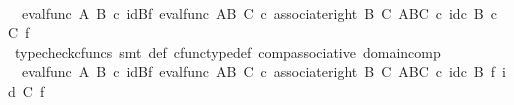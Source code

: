 \begin{isabellebody}
\ \isamarkupfalse%
\ {\isachardoublequoteopen}{\isachardot}{\kern0pt}{\isachardot}{\kern0pt}{\isachardot}{\kern0pt}\ {\isacharequal}{\kern0pt}{\isacharparenleft}{\kern0pt}eval{\isacharunderscore}{\kern0pt}func\ A\ B{\isacharparenright}{\kern0pt}\ {\isasymcirc}\isactrlsub c\ {\isacharparenleft}{\kern0pt}id{\isacharparenleft}{\kern0pt}B{\isacharparenright}{\kern0pt}{\isasymtimes}\isactrlsub f\ eval{\isacharunderscore}{\kern0pt}func\ {\isacharparenleft}{\kern0pt}A\isactrlbsup B\isactrlesup {\isacharparenright}{\kern0pt}\ C{\isacharparenright}{\kern0pt}\ {\isasymcirc}\isactrlsub c\ {\isacharparenleft}{\kern0pt}associate{\isacharunderscore}{\kern0pt}right\ B\ C\ {\isacharparenleft}{\kern0pt}{\isacharparenleft}{\kern0pt}A\isactrlbsup B\isactrlesup {\isacharparenright}{\kern0pt}\isactrlbsup C\isactrlesup {\isacharparenright}{\kern0pt}{\isacharparenright}{\kern0pt}\ {\isasymcirc}\isactrlsub c\ {\isacharparenleft}{\kern0pt}id\isactrlsub c\ {\isacharparenleft}{\kern0pt}B\ {\isasymtimes}\isactrlsub c\ C{\isacharparenright}{\kern0pt}\ {\isasymtimes}\isactrlsub f\ {\isasymphi}\isactrlsup {\isasymsharp}\isactrlsup {\isasymsharp}{\isacharparenright}{\kern0pt}{\isachardoublequoteclose}\isanewline
\ \ \ \ \ \ \ \ \isamarkupfalse%
\ {\isacharparenleft}{\kern0pt}typecheck{\isacharunderscore}{\kern0pt}cfuncs{\isacharcomma}{\kern0pt}\ smt\ {\isasympsi}{\isacharunderscore}{\kern0pt}def\ cfunc{\isacharunderscore}{\kern0pt}type{\isacharunderscore}{\kern0pt}def\ comp{\isacharunderscore}{\kern0pt}associative\ domain{\isacharunderscore}{\kern0pt}comp{\isacharparenright}{\kern0pt}\isanewline
\ \ \ \ \ \ \isamarkupfalse%
\ \isamarkupfalse%
\ {\isachardoublequoteopen}{\isachardot}{\kern0pt}{\isachardot}{\kern0pt}{\isachardot}{\kern0pt}\ {\isacharequal}{\kern0pt}{\isacharparenleft}{\kern0pt}eval{\isacharunderscore}{\kern0pt}func\ A\ B{\isacharparenright}{\kern0pt}\ {\isasymcirc}\isactrlsub c\ {\isacharparenleft}{\kern0pt}id{\isacharparenleft}{\kern0pt}B{\isacharparenright}{\kern0pt}{\isasymtimes}\isactrlsub f\ eval{\isacharunderscore}{\kern0pt}func\ {\isacharparenleft}{\kern0pt}A\isactrlbsup B\isactrlesup {\isacharparenright}{\kern0pt}\ C{\isacharparenright}{\kern0pt}\ {\isasymcirc}\isactrlsub c\ {\isacharparenleft}{\kern0pt}associate{\isacharunderscore}{\kern0pt}right\ B\ C\ {\isacharparenleft}{\kern0pt}{\isacharparenleft}{\kern0pt}A\isactrlbsup B\isactrlesup {\isacharparenright}{\kern0pt}\isactrlbsup C\isactrlesup {\isacharparenright}{\kern0pt}{\isacharparenright}{\kern0pt}\ {\isasymcirc}\isactrlsub c\ {\isacharparenleft}{\kern0pt}{\isacharparenleft}{\kern0pt}id\isactrlsub c\ {\isacharparenleft}{\kern0pt}B{\isacharparenright}{\kern0pt}\ {\isasymtimes}\isactrlsub f\ id{\isacharparenleft}{\kern0pt}\ C{\isacharparenright}{\kern0pt}{\isacharparenright}{\kern0pt}\ {\isasymtimes}\isactrlsub f\ {\isasymphi}\isactrlsup {\isasymsharp}\isactrlsup {\isasymsharp}{\isacharparenright}{\kern0pt}{\isachardoublequoteclose}\isanewline

\end{isabellebody}
